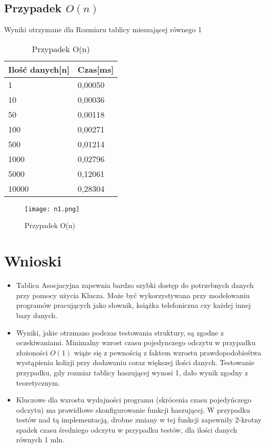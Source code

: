 \documentclass[12pt,a4paper,titlepage]{article}
\begin{document}
\subsection{Przypadek $O(n)$}
Wyniki otrzymane dla Rozmiaru tablicy mieszającej równego 1
\begin{table}[h]
\begin{center}
\begin{tabular}{|l|l|}
\hline
Ilość danych[n] &Czas[ms]  \\ \hline
1 & 0,00050 \\ \hline
10 &0,00036  \\ \hline
50 & 0,00118 \\ \hline
100 & 0,00271  \\ \hline
500 &0,01214 \\ \hline
1000 & 0,02796  \\ \hline
5000 &0,12061  \\ \hline
10000 & 0,28304  \\ \hline
\end{tabular}
\end{center}
\caption{Przypadek O(n)}
\end{table}
\begin{figure}[!htbp]
\texttt{[image: n1.png]}
\caption{Przypadek O(n)}
\end{figure}


\section{Wnioski}
\begin{itemize}
\item Tablica Asocjacyjna zapewnia bardzo szybki dostęp do potrzebnych danych przy pomocy użycia Klucza.
Może być wykorzystywana przy modelowaniu programów pracujących jako słownik, książka telefoniczna czy każdej innej bazy danych.
\item Wyniki, jakie otrzmano podczas testowania struktury, są zgodne z oczekiwaniami.\newline
Minimalny wzrost czasu pojedynczego odczytu w przypadku złożoności $O(1)$ wiąże się z pewnością z faktem wzrostu prawdopodobieśtwa wystąpienia kolizji przy dodawaniu coraz większej ilości danych.
Testowanie przypadku, gdy rozmiar tablicy haszującej wynosi 1, dało wynik zgodny z teoretycznym.
\item Kluczowe dla wzrostu wydajności programu (skrócenia czasu pojedyńczego odczytu) ma prawidłowe skonfigurowanie funkcji haszującej.\newline
W przypadku testów nad tą implementacją, drobne zmiany w tej funkcji zapewniły 2-krotny spadek czasu średniego odczytu w przypadku testów, dla ilości danych równych 1 mln. 
\end{itemize}
\end{document}
